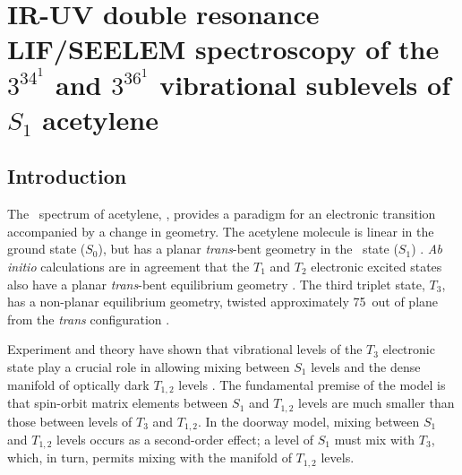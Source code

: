 % 




\chapter{  IR-UV double resonance LIF/SEELEM spectroscopy of the
  $3^34^1$  and $3^36^1$  vibrational sublevels of $S_1$
  acetylene}

\section{Introduction}

The \AtoX\ spectrum of acetylene, , provides a paradigm for
an electronic transition accompanied by a change in geometry.  The
acetylene molecule is linear in the ground state ($S_0$), but has a
planar \emph{trans}-bent geometry in the \astate\ state ($S_1$)
\cite{king52, ingold53, innes54}.  \emph{Ab initio} calculations are
in agreement that the $T_1$ and $T_2$ electronic excited states also
have a planar \emph{trans}-bent equilibrium geometry \cite{demoulin75,
  lischka86, yamaguchi93, sherrill96, malsch98, ventura03}.  The third
triplet state, $T_3$, has a non-planar equilibrium geometry, twisted
approximately 75\degrees\ out of plane from the \emph{trans}
configuration \cite{cui96, ventura03, thom07}.

Experiment and theory have shown that vibrational levels of the $T_3$
electronic state play a crucial role in allowing mixing between $S_1$
levels and the dense manifold of optically dark $T_{1,2}$ levels
\cite{humphrey97, altunata00, dupre93, cui97, thom07, ventura03}.  The
fundamental premise of the model is that spin-orbit matrix elements
between $S_1$ and $T_{1,2}$ levels are much smaller than those between
levels of $T_3$ and $T_{1,2}$.  In the doorway model, mixing between
$S_1$ and $T_{1,2}$ levels occurs as a second-order effect; a level
of $S_1$ must mix with $T_3$, which, in turn, permits mixing with the
manifold of $T_{1,2}$ levels.

